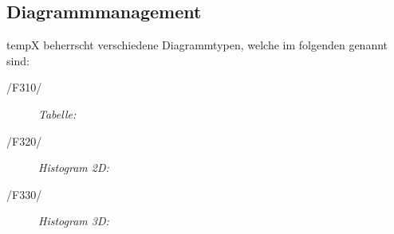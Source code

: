 \subsection{Diagrammmanagement}

\label{subsec:diagrammmgmt}

	\gls{tempX} beherrscht verschiedene Diagrammtypen, welche im folgenden genannt sind:
	
	\begin{description}

		\item[/F310/] \textit{Tabelle:}\par 
		

		\begin{figure}[htbp]
		 \centering
		\end{figure}


		\item[/F320/] \textit{Histogram 2D:}\par 
		\begin{figure}[htbp]
		 \centering
		\end{figure} 

		
		\item[/F330/] \textit{Histogram 3D:}\par
		\begin{figure}[htbp]
		 \centering
		\end{figure} 



\end{description}
